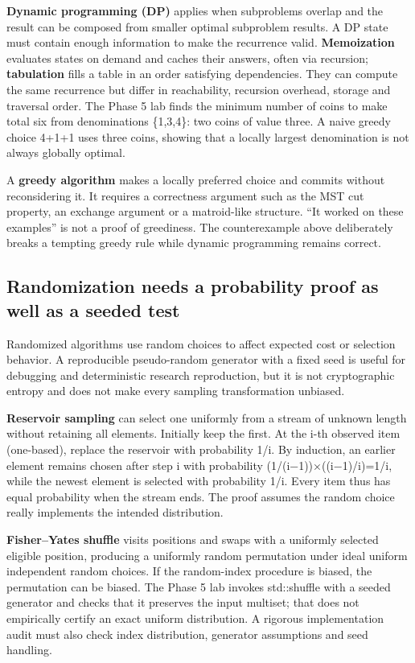 \textbf{Dynamic programming (DP)} applies when subproblems overlap and the result can be composed from smaller optimal subproblem results. A DP state must contain enough information to make the recurrence valid. \textbf{Memoization} evaluates states on demand and caches their answers, often via recursion; \textbf{tabulation} fills a table in an order satisfying dependencies. They can compute the same recurrence but differ in reachability, recursion overhead, storage and traversal order. The Phase 5 lab finds the minimum number of coins to make total six from denominations \{1,3,4\}: two coins of value three. A naive greedy choice 4+1+1 uses three coins, showing that a locally largest denomination is not always globally optimal.

A \textbf{greedy algorithm} makes a locally preferred choice and commits without reconsidering it. It requires a correctness argument such as the MST cut property, an exchange argument or a matroid-like structure. ``It worked on these examples'' is not a proof of greediness. The counterexample above deliberately breaks a tempting greedy rule while dynamic programming remains correct.

\subsection{Randomization needs a probability proof as well as a seeded test}\label{01-foundations-i-ch008-randomization-needs-a-probability-proof-as-well-as-a-seeded-test}

Randomized algorithms use random choices to affect expected cost or selection behavior. A reproducible pseudo-random generator with a fixed seed is useful for debugging and deterministic research reproduction, but it is not cryptographic entropy and does not make every sampling transformation unbiased.

\textbf{Reservoir sampling} can select one uniformly from a stream of unknown length without retaining all elements. Initially keep the first. At the i-th observed item (one-based), replace the reservoir with probability 1/i. By induction, an earlier element remains chosen after step i with probability (1/(i−1))×((i−1)/i)=1/i, while the newest element is selected with probability 1/i. Every item thus has equal probability when the stream ends. The proof assumes the random choice really implements the intended distribution.

\textbf{Fisher--Yates shuffle} visits positions and swaps with a uniformly selected eligible position, producing a uniformly random permutation under ideal uniform independent random choices. If the random-index procedure is biased, the permutation can be biased. The Phase 5 lab invokes std::shuffle with a seeded generator and checks that it preserves the input multiset; that does not empirically certify an exact uniform distribution. A rigorous implementation audit must also check index distribution, generator assumptions and seed handling.

